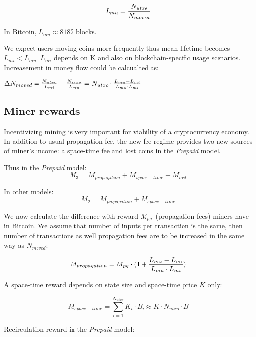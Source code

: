 \documentclass[]{llncs}   %
\begin{document}
\begin{equation}
L_{mu} = {N_{utxo} \over {N_{moved}}}
\end{equation}

In Bitcoin, $L_{mu} \approx 8182$ blocks.


We expect users moving coins more frequently thus mean lifetime becomes $L_{mi} < L_{mu}$. $L_{mi}$ depends on K and also on blockchain-specific usage scenarios. Increasement in money flow could be calcualted as:

$\Delta N_{moved} = {N_{utxo} \over L_{mi}} - {N_{utxo} \over L_{mu}} = N_{utxo} \cdot {{L_{mu}-L_{mi}} \over {L_{mu} \cdot L_{mi}}}$



\subsection{Miner rewards}
\label{minerrew}
Incentivizing mining is very important for viability of a cryptocurrency economy. 
In addition to usual propagation fee, the new fee regime provides two new sources of miner's income: a space-time fee and lost coins in the \textit{Prepaid} model.

Thus in the \textit{Prepaid} model:
\begin{equation}
M_{3} = M_{propagation} + M_{space-time} + M_{lost}
\end{equation}

In other models:
\begin{equation}
M_{2} = M_{propagation} + M_{space-time}
\end{equation}

We now calculate the difference with reward $M_{pg}$~(propagation fees) miners have in Bitcoin. We assume that number of inputs per transaction is the same, then number of transactions as well propagation fees are to be increased in the same way as $N_{moved}$:

\begin{equation}
M_{propagation} = M_{pg} \cdot(1 + {{L_{mu}-L_{mi}} \over {L_{mu} \cdot L_{mi}}})
\end{equation}


A space-time reward depends on state size and space-time price $K$ only:

\begin{equation}
M_{space-time} = \sum_{i=1}^{N_{utxo}} K_i \cdot B_i \approx K \cdot N_{utxo} \cdot B
\end{equation}

Recirculation reward in the \textit{Prepaid} model:
\end{document}
